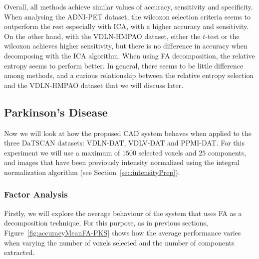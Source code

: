 Overall, all methods achieve similar values of accuracy, sensitivity and specificity. When analysing the ADNI-PET dataset, the wilcoxon selection criteria seems to outperform the rest especially with \ac{ICA}, with a higher accuracy and sensitivity. On the other hand, with the VDLN-HMPAO dataset, either the $t$-test or the wilcoxon achieves higher sensitivity, but there is no difference in accuracy when decomposing with the \ac{ICA} algorithm. When using \ac{FA} decomposition, the relative entropy seems to perform better. In general, there seems to be little difference among methods, and a curious relationship between the relative entropy selection and the VDLN-HMPAO dataset that we will discuss later. 

\FloatBarrier

\subsection{Parkinson's Disease}
Now we will look at how the proposed \ac{CAD} system behaves when applied to the three DaTSCAN datasets: VDLN-DAT, VDLV-DAT and PPMI-DAT. For this experiment we will use a maximum of $1500$ selected voxels and $25$ components, and images that have been previously intensity normalized using the integral normalization algorithm (see Section~\ref{sec:intensityPrep}). 

\subsubsection{Factor Analysis}
Firstly, we will explore the average behaviour of the system that uses \ac{FA} as a decomposition technique. For this purpose, as in previous sections, Figure~\ref{fig:accuracyMeanFA-PKS} shows how the average performance varies when varying the number of voxels selected and the number of components extracted. 

